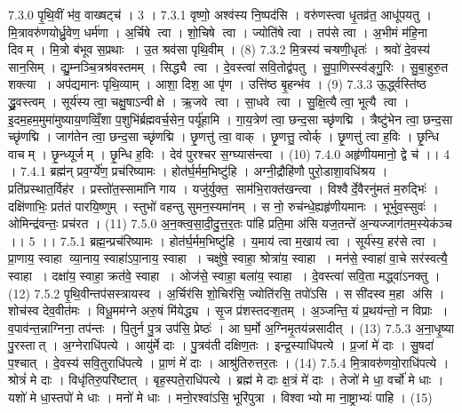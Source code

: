 7.3.0
पृ॒थि॒वीं भ॑व॒ वाख्षट्च॑ । 3 ।
7.3.1
वृष्णो॒ अश्व॑स्य नि॒ष्पद॑सि । वरु॑णस्त्वा धृ॒तव्र॑त॒ आधू॑पयतु । मि॒त्रावरु॑णयोर्ध्रु॒वेण॒ धर्म॑णा । अ॒र्चिषे त्वा । शो॒चिषे त्वा । ज्योति॑षे त्वा । तप॑से त्वा । अ॒भीमं म॑हि॒ना दिवम् । मि॒त्रो ब॑भूव स॒प्रथाः । उ॒त श्रव॑सा पृथि॒वीम् । (8)
7.3.2
मि॒त्रस्य॑ चऱ्षणी॒धृतः॑ । श्रवो॑ दे॒वस्य॑ सान॒सिम् । द्यु॒म्नञ्चि॒त्रश्र॑वस्तमम् । सिद्ध्यै त्वा । दे॒वस्त्वा॑ सवि॒तोद्व॑पतु । सु॒पा॒णिस्स्व॑ङ्गु॒रिः । सु॒बा॒हुरु॒त शक्त्या । अप॑द्यमानः पृथि॒व्याम् । आशा॒ दिश॒ आ पृ॑ण । उत्ति॑ष्ठ बृ॒हन्भ॑व । (9)
7.3.3
ऊ॒र्द्ध्वस्ति॑ष्ठ द्ध्रु॒वस्त्वम् । सूर्य॑स्य त्वा॒ चक्षु॒षाऽन्वीक्षे । ऋ॒जवे त्वा । सा॒धवे त्वा । सु॒क्षि॒त्यै त्वा॒ भूत्यै त्वा । इ॒दम॒हम॒मुमा॑मुष्याय॒णव्विँ॒शा प॒शुभि॑र्ब्रह्मवर्च॒सेन॒ पर्यू॑हामि । गा॒य॒त्रेण॑ त्वा॒ छन्द॒सा च्छृ॑णद्मि । त्रैष्टु॑भेन त्वा॒ छन्द॒सा च्छृ॑णद्मि । जाग॑तेन त्वा॒ छन्द॒सा च्छृ॑णद्मि । छृ॒णत्तु॑ त्वा॒ वाक् । छृ॒णत्तु॒ त्वोर्क् । छृ॒णत्तु॑ त्वा ह॒विः । छृ॒न्धि वाचम् । छृ॒न्ध्यूर्जम् । छृ॒न्धि ह॒विः । देव॑ पुरश्चर स॒ग्घ्यास॑न्त्वा । (10)
7.4.0
अहृ॑णीयमानो॒ द्वे च॑ ।। 4 ।
7.4.1
ब्रह्म॑न् प्रव॒र्ग्ये॑ण॒ प्रच॑रिष्यामः । होत॑र्घ॒र्मम॒भिष्टु॑हि । अग्नी॒द्रौहि॑णौ पुरो॒डाशा॒वधि॑श्रय । प्रति॑प्रस्थात॒र्विह॑र । प्रस्तो॑त॒स्सामा॑नि गाय । यजु॑र्युक्त॒॒ साम॑भि॒राक्त॑खन्त्वा । विश्वैर्दे॒वैरनु॑मतं म॒रुद्भिः॑ । दक्षि॑णाभिः॒ प्रत॑तं पारयि॒ष्णुम् । स्तुभो॑ वहन्तु सुमन॒स्यमा॑नम् । स नो॒ रुच॑न्धे॒ह्यहृ॑णीयमानः । भूर्भुव॒स्सुवः॑ । ओमिन्द्र॑वन्तः॒ प्रच॑रत । (11)
7.5.0
अ॒न॒क्त्व॒सा॒दी॒दु॒त्त॒र॒तः पा॑हि प्रति॒मा अ॑सि यज॒तन्ते॑ अ॒न्यज्जाग॑तम॒स्येक॑ञ्च ।। 5 ।।
7.5.1
ब्रह्म॒न्प्रच॑रिष्यामः । होत॑र्घ॒र्मम॒भिष्टु॑हि । य॒माय॑ त्वा म॒खाय॑ त्वा । सूर्य॑स्य॒ हर॑से त्वा । प्रा॒णाय॒ स्वाहा व्या॒नाय॒ स्वाहा॑ऽपा॒नाय॒ स्वाहा । चक्षु॑षे॒ स्वाहा॒ श्रोत्रा॑य॒ स्वाहा । मन॑से॒ स्वाहा॑ वा॒चे सर॑स्वत्यै॒ स्वाहा । दक्षा॑य॒ स्वाहा॒ क्रत॑वे॒ स्वाहा । ओज॑से॒ स्वाहा॒ बला॑य॒ स्वाहा । दे॒वस्त्वा॑ सवि॒ता मद्ध्वा॑ऽनक्तु । (12)
7.5.2
पृ॒थि॒वीन्तप॑सस्त्रायस्व । अ॒र्चिर॑सि शो॒चिर॑सि॒ ज्योति॑रसि॒ तपो॑ऽसि । ससी॑दस्व म॒हा अ॑सि । शोच॑स्व देव॒वीत॑मः । विधू॒मम॑ग्ने अरु॒षं मि॑येद्ध्य । सृ॒ज प्र॑शस्तदऱ्श॒तम् । अ॒ञ्जन्ति॒ यं प्र॒थय॑न्तो॒ न विप्राः । व॒पाव॑न्त॒न्नाग्निना॒ तप॑न्तः । पि॒तुर्न पु॒त्र उप॑सि॒ प्रेष्ठः॑ । आ घ॒र्मो अ॒ग्निमृ॒तय॑न्नसादीत् । (13)
7.5.3
अ॒ना॒धृ॒ष्या पु॒रस्तात् । अ॒ग्नेराधि॑पत्ये । आयु॑र्मे दाः । पु॒त्रव॑ती दक्षिण॒तः । इन्द्र॒स्याधि॑पत्ये । प्र॒जां मे॑ दाः । सु॒षदा॑ प॒श्चात् । दे॒वस्य॑ सवि॒तुराधि॑पत्ये । प्रा॒णं मे॑ दाः । आश्रु॑तिरुत्तर॒तः । (14)
7.5.4
मि॒त्रावरु॑णयो॒राधि॑पत्ये । श्रोत्रं॑ मे दाः । विधृ॑तिरु॒परि॑ष्टात् । बृह॒स्पते॒राधि॑पत्ये । ब्रह्म॑ मे दाः क्ष॒त्रं मे॑ दाः । तेजो॑ मे धा॒ वर्चो॑ मे धाः । यशो॑ मे धा॒स्तपो॑ मे धाः । मनो॑ मे धाः । मनो॒रश्वा॑ऽसि॒ भूरि॑पुत्रा । विश्वाभ्यो मा ना॒ष्ट्राभ्यः॑ पाहि । (15)
